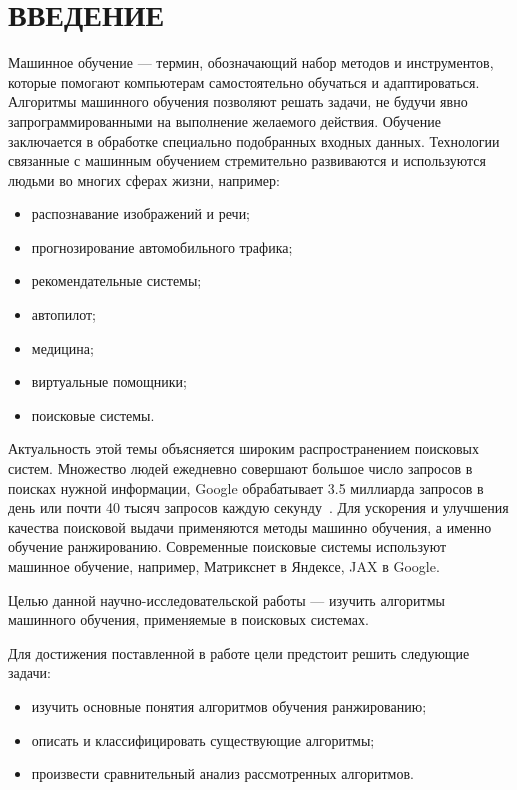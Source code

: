 \chapter*{ВВЕДЕНИЕ}

Машинное обучение --- термин, обозначающий набор методов и инструментов, которые помогают компьютерам самостоятельно обучаться и адаптироваться. Алгоритмы машинного обучения позволяют решать задачи, не будучи явно запрограммированными на выполнение желаемого действия. Обучение заключается в обработке специально подобранных входных данных. Технологии связанные с машинным обучением стремительно развиваются и используются людьми во многих сферах жизни, например:

\begin{itemize}[label=---]
	\item распознавание изображений и речи;
	\item прогнозирование автомобильного трафика;
	\item рекомендательные системы;
	\item автопилот;
	\item медицина;
	\item виртуальные помощники;
	\item поисковые системы.
\end{itemize}

Актуальность этой темы объясняется широким распространением поисковых систем. Множество людей ежедневно совершают большое число запросов в поисках нужной информации, Google обрабатывает 3.5 миллиарда запросов в день или почти 40 тысяч запросов каждую секунду~\cite{google}. Для ускорения и улучшения качества поисковой выдачи применяются методы машинно обучения, а именно обучение ранжированию. Современные поисковые системы используют машинное обучение, например, Матрикснет в Яндексе, JAX в Google.

Целью данной научно-исследовательской работы --- изучить алгоритмы машинного обучения, применяемые в поисковых системах. 

Для достижения поставленной в работе цели предстоит решить следующие задачи:
\begin{itemize}[label=---]
	\item изучить основные понятия алгоритмов обучения ранжированию;
	\item описать и классифицировать существующие алгоритмы;
	\item произвести сравнительный анализ рассмотренных алгоритмов.
\end{itemize}


